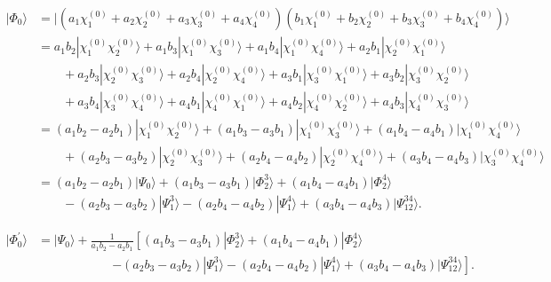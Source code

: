 \documentclass[a4paper]{book}
\newcounter{solution}[chapter]
\begin{document}
		\begin{solution}
	
	\begin{align*}
		| \Phi_0 \rangle &= | ( a_1 \chi^{(0)}_1 + a_2 \chi^{(0)}_2 + a_3 \chi^{(0)}_3 + a_4 \chi^{(0)}_4 ) ( b_1 \chi^{(0)}_1 + b_2 \chi^{(0)}_2 + b_3 \chi^{(0)}_3 + b_4 \chi^{(0)}_4 ) \rangle	\\
		&= a_1 b_2 | \chi^{(0)}_1 \chi^{(0)}_2 \rangle + a_1 b_3 | \chi^{(0)}_1 \chi^{(0)}_3 \rangle + a_1 b_4 | \chi^{(0)}_1 \chi^{(0)}_4 \rangle + a_2 b_1 | \chi^{(0)}_2 \chi^{(0)}_1 \rangle \\
		&\hspace{2em} + a_2 b_3 | \chi^{(0)}_2 \chi^{(0)}_3 \rangle + a_2 b_4 | \chi^{(0)}_2 \chi^{(0)}_4 \rangle + a_3 b_1 | \chi^{(0)}_3 \chi^{(0)}_1 \rangle + a_3 b_2 | \chi^{(0)}_3 \chi^{(0)}_2 \rangle \\
		&\hspace{2em}  + a_3 b_4 | \chi^{(0)}_3 \chi^{(0)}_4 \rangle + a_4 b_1 | \chi^{(0)}_4 \chi^{(0)}_1 \rangle + a_4 b_2 | \chi^{(0)}_4 \chi^{(0)}_2 \rangle + a_4 b_3 | \chi^{(0)}_4 \chi^{(0)}_3 \rangle \\
		&= ( a_1 b_2 - a_2 b_1 ) | \chi^{(0)}_1 \chi^{(0)}_2 \rangle + ( a_1 b_3 - a_3 b_1 ) | \chi^{(0)}_1 \chi^{(0)}_3 \rangle + ( a_1 b_4  - a_4 b_1 ) | \chi^{(0)}_1 \chi^{(0)}_4 \rangle \\
		&\hspace{2em} + ( a_2 b_3 - a_3 b_2 ) | \chi^{(0)}_2 \chi^{(0)}_3 \rangle + ( a_2 b_4 - a_4 b_2 ) | \chi^{(0)}_2 \chi^{(0)}_4 \rangle + ( a_3 b_4  - a_4 b_3 ) | \chi^{(0)}_3 \chi^{(0)}_4 \rangle \\
		&= ( a_1 b_2 - a_2 b_1 ) | \Psi_0 \rangle + ( a_1 b_3 - a_3 b_1 ) | \Phi^3_2 \rangle + ( a_1 b_4  - a_4 b_1 ) | \Phi^4_2 \rangle \\
		&\hspace{2em} - ( a_2 b_3 - a_3 b_2 ) | \Psi^3_1 \rangle - ( a_2 b_4 - a_4 b_2 ) | \Psi^4_1 \rangle + ( a_3 b_4  - a_4 b_3 ) | \Psi^{34}_{12} \rangle.
	\end{align*}		

	\begin{align*}
		| \Phi^\prime_0 \rangle &= | \Psi_0 \rangle + \frac{1}{ a_1 b_2 - a_2 b_1 } \left[ ( a_1 b_3 - a_3 b_1 ) | \Phi^3_2 \rangle + ( a_1 b_4  - a_4 b_1 ) | \Phi^4_2 \rangle \right. \\
		&\hspace{6em} \left. - ( a_2 b_3 - a_3 b_2 ) | \Psi^3_1 \rangle - ( a_2 b_4 - a_4 b_2 ) | \Psi^4_1 \rangle + ( a_3 b_4  - a_4 b_3 ) | \Psi^{34}_{12} \rangle \right].
	\end{align*}
	

\end{solution}
\end{document}
